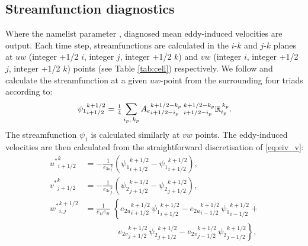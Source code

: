 \documentclass[../main/NEMO_manual]{subfiles}
\newcommand{\triadd}[5]{\ensuremath{{}_{#1}^{#2}{\mathbb{#3}}_{#4}^{\,#5}}}
\begin{document}
\subsection{Streamfunction diagnostics}
\label{sec:sfdiag}

Where the namelist parameter ,
diagnosed mean eddy-induced velocities are output.
Each time step, streamfunctions are calculated in the $i$-$k$ and $j$-$k$ planes at
$uw$ (integer +1/2 $i$, integer $j$, integer +1/2 $k$) and $vw$ (integer $i$, integer +1/2 $j$, integer +1/2 $k$)
points (see Table \autoref{tab:cell}) respectively.
We follow \citep{Griffies_Bk04} and calculate the streamfunction at a given $uw$-point from
the surrounding four triads according to:
\[
  {\psi_1}_{i+1/2}^{k+1/2}={\fractext{1}{4}}\sum_{\substack{i_p,\,k_p}}
  {A_e}_{i+1/2-i_p}^{k+1/2-k_p}\:\triadd{i+1/2-i_p}{k+1/2-k_p}{R}{i_p}{k_p}.
\]
The streamfunction $\psi_1$ is calculated similarly at $vw$ points.
The eddy-induced velocities are then calculated from the straightforward discretisation of \autoref{eq:eiv_v}:
\[
  \begin{split}
    {u^*}_{i+1/2}^{k} & = - \frac{1}{{e_{3u}}_{i}^{k}}\left({\psi_1}_{i+1/2}^{k+1/2}-{\psi_1}_{i+1/2}^{k+1/2}\right),   \\
    {v^*}_{j+1/2}^{k} & = - \frac{1}{{e_{3v}}_{j}^{k}}\left({\psi_2}_{j+1/2}^{k+1/2}-{\psi_2}_{j+1/2}^{k+1/2}\right),   \\
    {w^*}_{i,j}^{k+1/2} & =    \frac{1}{e_{1t}e_{2t}}\; \left\{
      {e_{2u}}_{i+1/2}^{k+1/2} \,{\psi_1}_{i+1/2}^{k+1/2} -
      {e_{2u}}_{i-1/2}^{k+1/2} \,{\psi_1}_{i-1/2}^{k+1/2} \right. + \\
    \phantom{=} & \qquad\qquad\left. {e_{2v}}_{j+1/2}^{k+1/2} \,{\psi_2}_{j+1/2}^{k+1/2} - {e_{2v}}_{j-1/2}^{k+1/2} \,{\psi_2}_{j-1/2}^{k+1/2} \right\},
  \end{split}
\]

\biblio

\pindex
\end{document}
